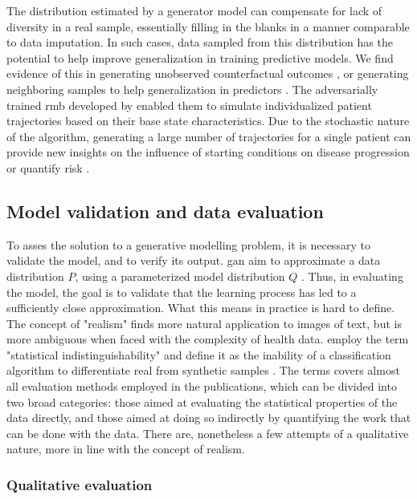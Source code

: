         The distribution estimated by a generator model can compensate for lack of diversity in a real sample, essentially filling in the blanks in a manner comparable to data imputation. In such cases, data sampled from this distribution has the potential to help improve generalization in training predictive models. We find evidence of this in generating unobserved counterfactual outcomes \cite{yoon2018imputation}, or generating neighboring samples to help generalization in predictors \cite{Che_2017}. The adversarially trained \gls{rmb} developed by \citeauthor{Fisher2019} enabled them to simulate individualized patient trajectories based on their base state characteristics. Due to the stochastic nature of the algorithm, generating a large number of trajectories for a single patient can provide new insights on the influence of starting conditions on disease progression or quantify risk \cite{Fisher2019}.
        
    \subsection{Model validation and data evaluation}
    
        To asses the solution to a generative modelling problem, it is necessary to validate the model, and to verify its output. \gls{gan} aim to approximate a data distribution $P$, using a parameterized model distribution $Q$ \cite{Borji2018-fy}. Thus, in evaluating the model, the goal is to validate that the learning process has led to a sufficiently close approximation. What this means in practice is hard to define. The concept of "realism" finds more natural application to images of text, but is more ambiguous when faced with the complexity of health data. \citeauthor{walsh2020generating} employ the term "statistical indistinguishability" and define it as the inability of a classification algorithm to differentiate real from synthetic samples \cite{walsh2020generating}. The terms covers almost all evaluation methods employed in the publications, which can be divided into two broad categories: those aimed at evaluating the statistical properties of the data directly, and those aimed at doing so indirectly by quantifying the work that can be done with the data. There are, nonetheless a few attempts of a qualitative nature, more in line with the concept of realism. 

        \subsubsection{Qualitative evaluation}
        
